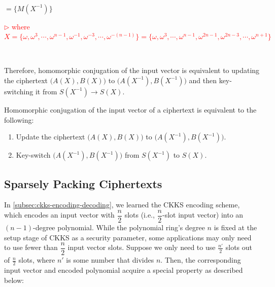 $ $

$=\{M(X^{-1})\}$ 

\textcolor{red}{ $\rhd$ where $X = \{\omega, \omega^{3}, \cdots, \omega^{n - 1}, \omega^{-1}, \omega^{-3}, \cdots, \omega^{-(n-1)}\}  = \{\omega, \omega^{3}, \cdots, \omega^{n - 1}, \omega^{2n-1}, \omega^{2n-3}, \cdots, \omega^{n+1} \}$}


$ $

Therefore, homomorphic conjugation of the input vector is equivalent to updating the ciphertext $\bm{(}A(X), B(X)\bm{)}$ to $\bm{(}A(X^{-1}), B(X^{-1})\bm{)}$ and then key-switching it from $S(X^{-1}) \rightarrow S(X)$. 


\begin{tcolorbox}[title={\textbf{\tboxlabel{\ref*{subsec:ckks-conjugation}} CKKS's Homomorphic Conjugation}}]

Homomorphic conjugation of the input vector of a ciphertext is equivalent to the following:

\begin{enumerate}
\item Update the ciphertext $\bm{(}A(X), B(X)\bm{)}$ to $\bm{(}A(X^{-1}), B(X^{-1})\bm{)}$.
\item Key-switch $\bm{(}A(X^{-1}), B(X^{-1})\bm{)}$ from $S(X^{-1})$ to $S(X)$.

\end{enumerate}

\end{tcolorbox}

\subsection{Sparsely Packing Ciphertexts}
\label{subsec:ckks-sparse-packing}

In \autoref{subsec:ckks-encoding-decoding}, we learned the CKKS encoding scheme, which encodes an input vector with $\dfrac{n}{2}$ slots (i.e., $\dfrac{n}{2}$-slot input vector) into an $(n-1)$-degree polynomial. While the polynomial ring's degree $n$ is fixed at the setup stage of CKKS as a security parameter, some applications may only need to use fewer than $\dfrac{n}{2}$ input vector slots. Suppose we only need to use $\frac{n'}{2}$ slots out of $\frac{n}{2}$ slots, where $n'$ is some number that divides $n$. Then, the corresponding input vector and encoded polynomial acquire a special property as described below:


